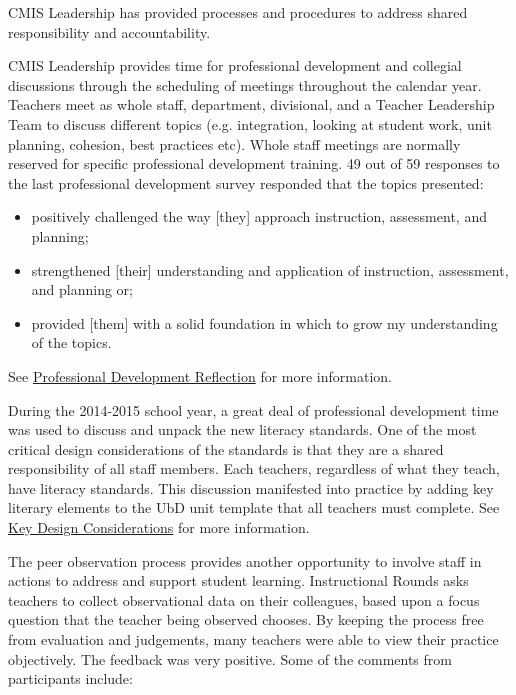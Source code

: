 \begin{findings}
CMIS Leadership has provided processes and procedures to address shared responsibility and accountability. 


CMIS Leadership provides time for professional development and collegial discussions through the scheduling of meetings throughout the calendar year. Teachers meet as whole staff, department, divisional, and a Teacher Leadership Team to discuss different topics (e.g. integration, looking at student work, unit planning, cohesion, best practices etc). Whole staff meetings are normally reserved for specific professional development training. 49 out of 59 responses to the last professional development survey responded that the topics presented: 

\begin{itemize}
\item positively challenged the way [they] approach instruction, assessment, and planning; 
\item strengthened [their] understanding and application of instruction, assessment, and planning or; 
\item provided [them] with a solid foundation in which to grow my understanding of the topics.
\end{itemize}

See \href{https://docs.google.com/a/cmis.ac.th/forms/d/1-00JLey-jyLuizymm8z8JGJ6iLp4l-ccsTgHJ_Ckcj8/viewanalytics}{Professional Development Reflection} for more information. 

During the 2014-2015 school year, a great deal of professional development time was used to discuss and unpack the new literacy standards. One of the most critical design considerations of the standards is that they are a shared responsibility of all staff members. Each teachers, regardless of what they teach, have literacy standards. This discussion manifested into practice by adding key literary elements to the UbD unit template that all teachers must complete. See \href{http://www.corestandards.org/ELA-Literacy/introduction/key-design-consideration/}{Key Design Considerations} for more information. 
		
\href{https://docs.google.com/a/cmis.ac.th/presentation/d/1j9DjUPHbIprWWbftcBxiF35BKmzU5C_lW9Z78f8CAeE/edit?usp=sharing}{}
The peer observation process provides another opportunity to involve staff in actions to address and support student learning. Instructional Rounds asks teachers to collect observational data on their colleagues, based upon a focus question that the teacher being observed chooses. By keeping the process free from evaluation and judgements, many teachers were able to view their practice objectively. The feedback was very positive. Some of the comments from participants include:


\end{findings}
